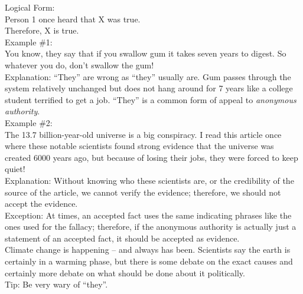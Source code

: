 \documentclass[a4paper,12pt,single,pdftex]{scrartcl}
\begin{document}
    
      Logical Form:
    \\

    
      Person 1 once heard that X was true.
    \\

    
      Therefore, X is true.
    \\

    
      Example \#1:
    \\

    
      You know, they say that if you swallow gum it takes seven years to digest.  So whatever you do, don’t swallow the gum!
    \\

    
      Explanation: “They” are wrong as “they” usually are.  Gum passes through the system relatively unchanged but does not hang around for 7 years like a college student terrified to get a job.  “They” is a common form of appeal to {\it anonymous authority}.
    \\

    
      Example \#2:
    \\

    
      The 13.7 billion-year-old universe is a big conspiracy.  I read this article once where these notable scientists found strong evidence that the universe was created 6000 years ago, but because of losing their jobs, they were forced to keep quiet!
    \\

    
      Explanation: Without knowing who these scientists are, or the credibility of the source of the article, we cannot verify the evidence; therefore, we should not accept the evidence.
    \\

    
      Exception: At times, an accepted fact uses the same indicating phrases like the ones used for the fallacy; therefore, if the anonymous authority is actually just a statement of an accepted fact, it should be accepted as evidence.
    \\

    
      Climate change is happening -- and always has been.  Scientists say the earth is certainly in a warming phase, but there is some debate on the exact causes and certainly more debate on what should be done about it politically.
    \\

    
      Tip: Be very wary of “they”.
    \\

  
\end{document}
